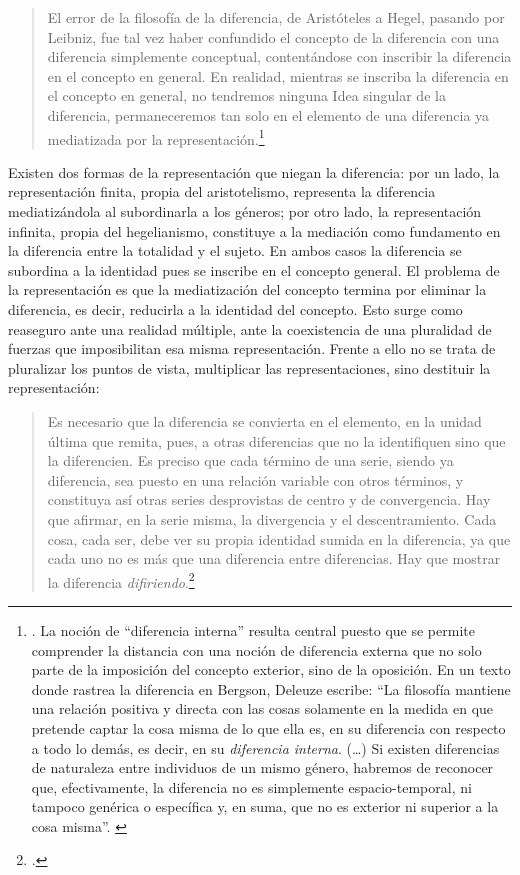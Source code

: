 \begin{quote}
El error de la filosofía de la diferencia, de Aristóteles a Hegel, pasando por Leibniz, fue tal vez haber confundido el concepto de la diferencia con una diferencia simplemente conceptual, contentándose con inscribir la diferencia en el concepto en general. En realidad, mientras se inscriba la diferencia en el concepto en general, no tendremos ninguna Idea singular de la diferencia, permaneceremos tan solo en el elemento de una diferencia ya mediatizada por la representación.\footnote{\cite[Véase][58]{@6961-DELEUZE2002}. La noción de \enquote{diferencia interna} resulta central puesto que se permite comprender la distancia con una noción de diferencia externa que no solo parte de la imposición del concepto exterior, sino de la oposición. En un texto donde rastrea la diferencia en Bergson, Deleuze escribe: \enquote{La filosofía mantiene una relación positiva y directa con las cosas solamente en la medida en que pretende captar la cosa misma de lo que ella es, en su diferencia con respecto a todo lo demás, es decir, en su \emph{diferencia interna}. (\ldots) Si existen diferencias de naturaleza entre individuos de un mismo género, habremos de reconocer que, efectivamente, la diferencia no es simplemente espacio-temporal, ni tampoco genérica o específica y, en suma, que no es exterior ni superior a la cosa misma}. \cite[46]{@6977-DELEUZE2005}}
\end{quote}

Existen dos formas de la representación que niegan la diferencia: por un lado, la representación finita, propia del aristotelismo, representa la diferencia mediatizándola al subordinarla a los géneros; por otro lado, la representación infinita, propia del hegelianismo, constituye a la mediación como fundamento en la diferencia entre la totalidad y el sujeto. En ambos casos la diferencia se subordina a la identidad pues se inscribe en el concepto general. El problema de la representación es que la mediatización del concepto termina por eliminar la diferencia, es decir, reducirla a la identidad del concepto. Esto surge como reaseguro ante una realidad múltiple, ante la coexistencia de una pluralidad de fuerzas que imposibilitan esa misma representación. Frente a ello no se trata de pluralizar los puntos de vista, multiplicar las representaciones, sino destituir la representación:

\begin{quote}
Es necesario que la diferencia se convierta en el elemento, en la unidad última que remita, pues, a otras diferencias que no la identifiquen sino que la diferencien. Es preciso que cada término de una serie, siendo ya diferencia, sea puesto en una relación variable con otros términos, y constituya así otras series desprovistas de centro y de convergencia. Hay que afirmar, en la serie misma, la divergencia y el descentramiento. Cada cosa, cada ser, debe ver su propia identidad sumida en la diferencia, ya que cada uno no es más que una diferencia entre diferencias. Hay que mostrar la diferencia \emph{difiriendo}.\footcite[101]{@6961-DELEUZE2002}
\end{quote}

